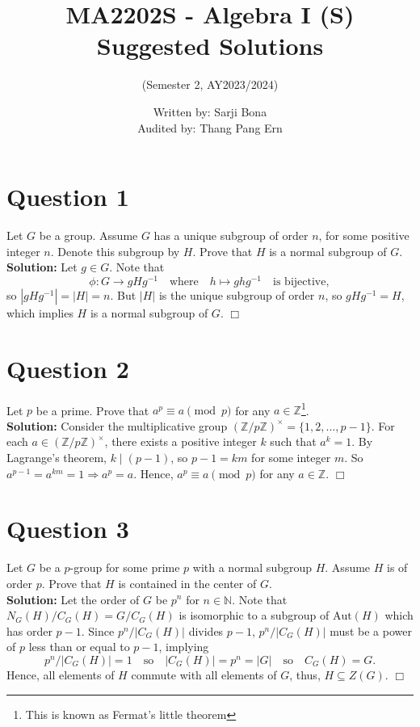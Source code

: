 \documentclass[12pt]{article}
\title{MA2202S - Algebra I (S) Suggested Solutions}
\author{(Semester 2, AY2023/2024)}
\date{Written by: Sarji Bona\\Audited by: Thang Pang Ern}
\begin{document}
\maketitle 

\section*{Question 1}
Let $G$ be a group. Assume $G$ has a unique subgroup of order $n$, for some positive integer $n$. Denote this subgroup by $H$. Prove that $H$ is a normal subgroup of $G$. \\

\noindent \textbf{Solution:} Let $g \in G$. Note that \[\phi:G\to gHg^{-1}\quad\text{where}\quad h\mapsto ghg^{-1}\quad\text{is bijective},\]
so $|gHg^{-1}| = |H| = n$. But $|H|$ is the unique subgroup of order $n$, so $gHg^{-1} = H$, which implies $H$ is a normal subgroup of $G$. \hfill $\Box$
    
\section*{Question 2}
Let $p$ be a prime. Prove that $a^p \equiv a \pmod{p}$ for any $a \in \mathbb{Z}$\footnote{This is known as Fermat's little theorem}. \\

\noindent \textbf{Solution:} Consider the multiplicative group $(\mathbb{Z}/p\mathbb{Z})^{\times} = \{1, 2, \dots, p - 1\}$. For each $a \in (\mathbb{Z}/p\mathbb{Z})^{\times}$, there exists a positive integer $k$ such that $a^k = 1$. By Lagrange's theorem, $k \mid \left(p - 1\right)$, so $p - 1 = km$ for some integer $m$. So $a^{p-1} = a^{km} = 1 \Rightarrow a^p = a$. Hence, $a^p \equiv a \pmod{p}$ for any $a \in \mathbb{Z}$. \hfill $\Box$

\section*{Question 3}
Let $G$ be a $p$-group for some prime $p$ with a normal subgroup $H$. Assume $H$ is of order $p$. Prove that $H$ is contained in the center of $G$. \\

\noindent \textbf{Solution:} Let the order of $G$ be $p^n$ for $n\in\mathbb{N}$. Note that $N_G(H)/C_G(H) = G/C_G(H)$ is isomorphic to a subgroup of $\mathrm{Aut}(H)$ which has order $p-1$. Since $p^n/|C_G(H)|$ divides $p - 1$,  $p^n/|C_G(H)|$ must be a power of $p$ less than or equal to $p-1$, implying \[p^n/|C_G(H)| = 1\quad\text{so}\quad |C_G(H)| = p^n = |G|\quad\text{so}\quad C_G(H) = G.\]
Hence, all elements of $H$ commute with all elements of $G$, thus, $H\subseteq Z\left(G\right)$. \hfill $\Box$
    
\end{document}
